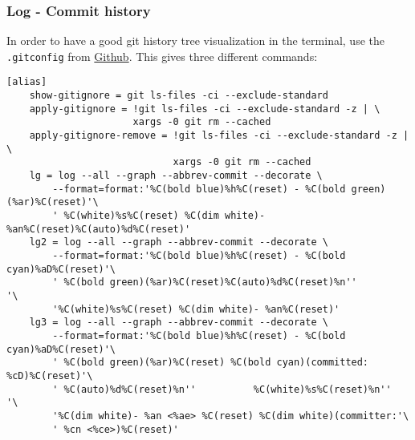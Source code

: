 \subsubsection{Log - Commit history}

In order to have a good git history tree visualization in the terminal, use the \texttt{.gitconfig} from \href{https://github.com/robinhellmers/computer_setup/blob/master/git_setup/gitconfig}{Github}. This gives three different commands:


\begin{verbatim}
[alias]
    show-gitignore = git ls-files -ci --exclude-standard
    apply-gitignore = !git ls-files -ci --exclude-standard -z | \
                      xargs -0 git rm --cached
    apply-gitignore-remove = !git ls-files -ci --exclude-standard -z | \
                             xargs -0 git rm --cached
    lg = log --all --graph --abbrev-commit --decorate \
		--format=format:'%C(bold blue)%h%C(reset) - %C(bold green)(%ar)%C(reset)'\
		' %C(white)%s%C(reset) %C(dim white)- %an%C(reset)%C(auto)%d%C(reset)'
    lg2 = log --all --graph --abbrev-commit --decorate \
		--format=format:'%C(bold blue)%h%C(reset) - %C(bold cyan)%aD%C(reset)'\
		' %C(bold green)(%ar)%C(reset)%C(auto)%d%C(reset)%n''          '\
		'%C(white)%s%C(reset) %C(dim white)- %an%C(reset)'
    lg3 = log --all --graph --abbrev-commit --decorate \
		--format=format:'%C(bold blue)%h%C(reset) - %C(bold cyan)%aD%C(reset)'\
		' %C(bold green)(%ar)%C(reset) %C(bold cyan)(committed: %cD)%C(reset)'\
		' %C(auto)%d%C(reset)%n''          %C(white)%s%C(reset)%n''          '\
		'%C(dim white)- %an <%ae> %C(reset) %C(dim white)(committer:'\
		' %cn <%ce>)%C(reset)'
\end{verbatim}